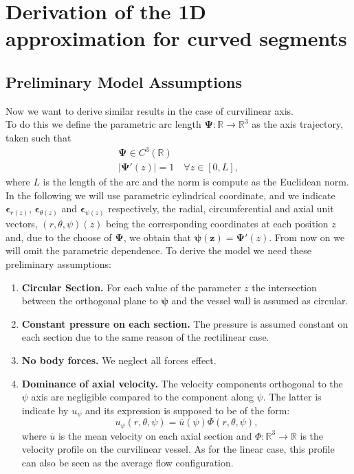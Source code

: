 \documentclass[a4paper]{report}
\begin{document}
\section{Derivation of the 1D approximation for curved segments}
\subsection{Preliminary Model  Assumptions}
Now we want to derive similar results in the case of curvilinear axis.\\
To do this we define the parametric arc length $\boldsymbol{\Psi}: \mathbb{R} \rightarrow \mathbb{R}^3$ as the axis trajectory, taken such that
\begin{equation}
\begin{split}
\boldsymbol{\Psi} \in C^3(\mathbb{R}) \\
| \boldsymbol{\Psi} ' (z) | = 1 \quad \forall z \in [0,L],
\end{split}
\end{equation}
where $L$ is the length of the arc  and the norm is compute as the Euclidean norm.
In the following we will use parametric cylindrical coordinate, and we indicate $\boldsymbol{\epsilon}_{r(z)}$, $\boldsymbol{\epsilon}_{\theta(z)}$ and $\boldsymbol{\epsilon}_{\psi(z)}$ respectively, the radial, circumferential and axial unit vectors, $(r,\theta,\psi)(z)$ being the corresponding coordinates at each position $z$ and, due to the choose of $\boldsymbol{\Psi}$, we obtain that $\boldsymbol{\psi (z)}=\boldsymbol{\Psi}'(z)$.
From now on we will omit the parametric dependence.
To derive the model we need these preliminary assumptions:
	

	\begin{enumerate}
	\item\textbf{Circular Section.} For each value of the parameter $z$ the intersection between the orthogonal plane to $\boldsymbol{\psi }$ and the vessel wall is assumed as circular.
	\item \textbf{Constant pressure on each section.} The pressure is assumed constant on each section due to the same reason of the rectilinear case.
	\item \textbf{No body forces.} We neglect all forces effect.
	\item \textbf{Dominance of axial velocity.} The velocity components orthogonal to the $\psi$  axis are negligible compared to the component along $\psi$. The latter is indicate by $u_{\psi}$ and its expression is supposed to be of the form:
	\begin{equation}
 	u_{\psi}(r,\theta,\psi)= \overline{u}(\psi) \Phi (r,\theta,\psi),
	\end{equation}
where $\overline{u}$ is the mean velocity on each axial section and $\Phi :\mathbb{R}^3 \rightarrow \mathbb{R}$ is the velocity profile on the curvilinear vessel. As for the linear case, this profile can also be seen as the average flow configuration.
	\end{enumerate}
\end{document}
